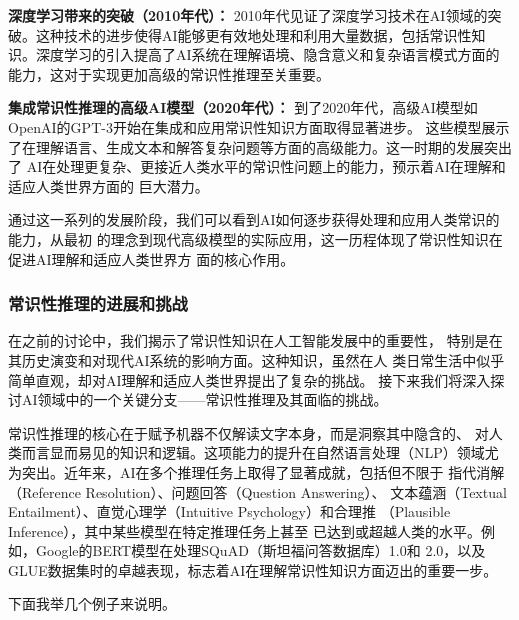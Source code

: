 \textbf{深度学习带来的突破（2010年代）：}
2010年代见证了深度学习技术在AI领域的突破。这种技术的进步使得AI能够更有效地处理和利用大量数据，包括常识性知识。深度学习的引入提高了AI系统在理解语境、隐含意义和复杂语言模式方面的能力，这对于实现更加高级的常识性推理至关重要。

\textbf{集成常识性推理的高级AI模型（2020年代）：}
到了2020年代，高级AI模型如OpenAI的GPT-3开始在集成和应用常识性知识方面取得显著进步。
这些模型展示了在理解语言、生成文本和解答复杂问题等方面的高级能力。这一时期的发展突出了
AI在处理更复杂、更接近人类水平的常识性问题上的能力，预示着AI在理解和适应人类世界方面的
巨大潜力。

通过这一系列的发展阶段，我们可以看到AI如何逐步获得处理和应用人类常识的能力，从最初
的理念到现代高级模型的实际应用，这一历程体现了常识性知识在促进AI理解和适应人类世界方
面的核心作用。

\subsubsection{常识性推理的进展和挑战}
\label{sec1:challenge}

在之前的讨论中，我们揭示了常识性知识在人工智能发展中的重要性，
特别是在其历史演变和对现代AI系统的影响方面。这种知识，虽然在人
类日常生活中似乎简单直观，却对AI理解和适应人类世界提出了复杂的挑战。
接下来我们将深入探讨AI领域中的一个关键分支——常识性推理及其面临的挑战。

常识性推理的核心在于赋予机器不仅解读文字本身，而是洞察其中隐含的、
对人类而言显而易见的知识和逻辑。这项能力的提升在自然语言处理（NLP）领域尤
为突出。近年来，AI在多个推理任务上取得了显著成就，包括但不限于
指代消解（Reference Resolution）、问题回答（Question Answering）、
文本蕴涵（Textual Entailment）、直觉心理学（Intuitive Psychology）和合理推
（Plausible Inference），其中某些模型在特定推理任务上甚至
已达到或超越人类的水平。例如，Google的BERT模型在处理SQuAD（斯坦福问答数据库）1.0\cite{rajpurkar2016squad}和
2.0\cite{rajpurkar2018know}，以及
GLUE\cite{wang2018glue}数据集时的卓越表现，标志着AI在理解常识性知识方面迈出的重要一步。

下面我举几个例子来说明。

